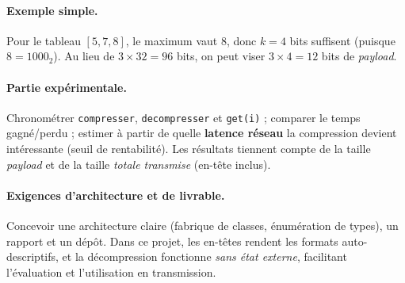 \paragraph{Exemple simple.} Pour le tableau $[5,7,8]$, le maximum vaut 8, donc $k=4$ bits suffisent (puisque $8=1000_2$). Au lieu de $3\times 32=96$ bits, on peut viser $3\times 4=12$ bits de \emph{payload}.


\paragraph{Partie expérimentale.}
Chronométrer \verb|compresser|, \verb|decompresser| et \verb|get(i)| ; comparer le temps gagné/perdu ; estimer à partir de quelle \textbf{latence réseau} la compression devient intéressante (seuil de rentabilité). Les résultats tiennent compte de la taille \emph{payload} et de la taille \emph{totale transmise} (en-tête inclus).

\paragraph{Exigences d'architecture et de livrable.}
Concevoir une architecture claire (fabrique de classes, énumération de types), un rapport et un dépôt. Dans ce projet, les en-têtes rendent les formats auto-descriptifs, et la décompression fonctionne \emph{sans état externe}, facilitant l'évaluation et l'utilisation en transmission.
